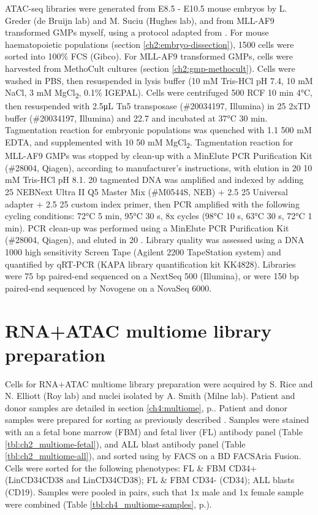 ATAC-seq libraries were generated from E8.5 - E10.5 mouse embryos by L. Greder (de Bruijn lab) and M. Suciu (Hughes lab), and from MLL-AF9 transformed GMPs myself, using a protocol adapted from \citep{buenrostro_atac-seq_2015}. For mouse haematopoietic populations (section \ref{ch2:embryo-dissection}), 1500 cells were sorted into 100\% FCS (Gibco).
For MLL-AF9 transformed GMPs,  cells were harvested from MethoCult cultures (section \ref{ch2:gmp-methocult}). Cells were washed in PBS, then resuspended in lysis buffer (10 mM Tris-HCl pH 7.4, 10 mM NaCl, 3 mM MgCl\textsubscript{2}, 0.1\% IGEPAL). Cells were centrifuged 500 RCF 10 min 4°C, then resuspended with 2.5μL Tn5 transposase (\#20034197, Illumina) in 25 \microl{} 2xTD buffer (\#20034197, Illumina) and 22.7 \microl{} \water{} and incubated at 37°C 30 min. Tagmentation reaction for embryonic populations was quenched with 1.1 \microl{} 500 mM EDTA, and supplemented with 10 \microl{} 50 mM MgCl\textsubscript{2}. Tagmentation reaction for MLL-AF9 GMPs was stopped by clean-up with a MinElute PCR Purification Kit (\#28004, Qiagen), according to manufacturer's instructions, with elution in 20 \microl{} 10 mM Tris-HCl pH 8.1. 20 \microl{} tagmented DNA was amplified and indexed by adding 25 \microl{} NEBNext Ultra II Q5 Master Mix (\#M0544S, NEB) + 2.5 \microl{} 25 \microm{} Universal adapter + 2.5 \microl{} 25 \microm{} custom index primer, then PCR amplified with the following cycling conditions: 72°C 5 min, 95°C 30 s, 8x cycles (98°C 10 s, 63°C 30 s, 72°C 1 min). PCR clean-up was performed using a MinElute PCR Purification Kit (\#28004, Qiagen), and eluted in 20 \microl{} \water{}. Library quality was assessed using a DNA 1000 high sensitivity Screen Tape (Agilent 2200 TapeStation system) and quantified by qRT-PCR (KAPA library quantification kit KK4828). Libraries were 75 bp paired-end sequenced on a NextSeq 500 (Illumina), or were 150 bp paired-end sequenced by Novogene on a NovaSeq 6000.

\section{\label{ch2:multiome}RNA+ATAC multiome library preparation}
Cells for RNA+ATAC multiome library preparation were acquired by S. Rice and N. Elliott (Roy lab) and nuclei isolated by A. Smith (Milne lab). Patient and donor samples are detailed in section \ref{ch4:multiome}, p.\pageref{ch4:multiome}. Patient and donor samples were prepared for sorting as previously described \citep{obyrne_discovery_2019}. Samples were stained with an a fetal bone marrow (FBM) and fetal liver (FL) antibody panel (Table \ref{tbl:ch2_multiome-fetal}), and ALL blast antibody panel (Table \ref{tbl:ch2_multiome-all}), and sorted using by FACS on a BD FACSAria Fusion. Cells were sorted for the following phenotypes: FL \& FBM CD34+ (Lin\uneg{}CD34\upos{}CD38\uneg{} and Lin\uneg{}CD34\upos{}CD38\upos{}); FL \& FBM CD34- (CD34\uneg{}); ALL blasts (CD19\upos{}). Samples were pooled in pairs, such that 1x male and 1x female sample were combined (Table \ref{tbl:ch4_multiome-samples}, p.\pageref{tbl:ch4_multiome-samples}).


